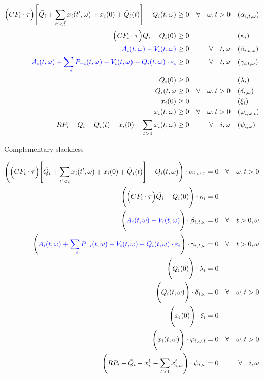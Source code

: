 \documentclass[11pt, letterpaper]{article}
\newcommand{\pia}{\textcolor[rgb]{0,0,1}}
\begin{document}
\begin{align}
    \Big(CF_i \cdot\tau\Big)  \Bigg[\bar{Q_i} + \sum_{t^{\prime}<\bar{t}} x_i(t^\prime,\omega) + x_i(0)+ \bar{Q}_i(t) \Bigg] - Q_i(t,\omega) & \geq 0  & \forall  \quad \omega, t  > 0 & \quad (\alpha_{i,t,\omega}) \\
    \Big(CF_i\cdot\tau \Big)\bar{Q_i}-Q_{i}(0) & \geq 0  &  \quad & \quad (\kappa_i) \\
\pia{A_i(t,\omega) - V_i(t,\omega) } & \geq  0  & \forall  \quad t,\omega & \quad (\beta_{i,t,\omega})\\
  \pia{ A_i(t,\omega) + \sum_{-i}P_{-i}(t,\omega) - V_i(t,\omega)-Q_i(t, \omega)\cdot \varepsilon_{i}} & \geq  0  &\forall \quad t,\omega & \quad (\gamma_{i,t,\omega})\\
 Q_i(0) & \geq  0 & \quad & \quad (\lambda_i)\\
 Q_i(t, \omega & \geq  0   & \forall  \quad \omega, t >0 & \quad (\delta_{i,\omega})\\
  x_i(0) & \geq  0 & \quad & \quad (\xi_i)\\
  x_i(t, \omega) & \geq  0   & \forall  \quad \omega, t >0 & \quad (\varphi_{i,\omega,t})\\
 RP_i - \bar{Q}_i - \bar{Q}_i(t) - x_i(0) - \sum_{t > 0} x_i(t,\omega)  &  \geq 0 &  \forall \quad i,\omega &  \quad (\psi_{i,\omega}) 
  \end{align}
  \begin{flushleft}
Complementary slackness
\end{flushleft}

\begin{align}
    \Bigg(\Big(CF_i \cdot\tau\Big)  \Bigg[\bar{Q_i} + \sum_{t^{\prime}<\bar{t}} x_i(t^\prime,\omega) + x_i(0)+ \bar{Q}_i(t) \Bigg] - Q_i(t,\omega)\Bigg) \cdot \alpha_{i,\omega,\tau} & = 0 & \forall  \quad \omega, t  > 0\\
    \Bigg(  \Big(CF_i\cdot\tau \Big)\bar{Q_i}-Q_{i}(0) \Bigg)\cdot \kappa_i & = 0  & \quad  \\
    \Bigg( \pia{ A_i(t,\omega) - V_i(t,\omega) } \Bigg) \cdot \beta_{i,t,\omega} & = 0 & \forall  \quad t>0 ,\omega\\
    \Bigg(  \pia{ A_i(t,\omega) + \sum_{-i}P_{-i}(t,\omega) - V_i(t,\omega)-Q_i(t, \omega)\cdot \varepsilon_{i}} \Bigg)\cdot \gamma_{i,t,\omega} & = 0 & \forall \quad t>0, \omega \\
    \Bigg( Q_i(0) \Bigg) \cdot \lambda_i & = 0 & \\
    \Bigg(Q_i(t,\omega)\Bigg ) \cdot \delta_{i,\omega} & = 0 & \forall  \quad \omega, t >0\\
    \Bigg( x_i(0) \Bigg) \cdot \xi_i & = 0 & \\
    \Bigg( x_i(t,\omega) \Bigg) \cdot \varphi_{i,\omega,t} & = 0 & \forall  \quad \omega, t >0 \\
    \Bigg(RP_i - \bar{Q}_i - x^{1}_i - \sum_{t>1} x^{t}_{i,w}  \Bigg) \cdot \psi_{i,\omega}&  = 0 &  \forall \quad i,\omega 
\end{align}
\end{document}
